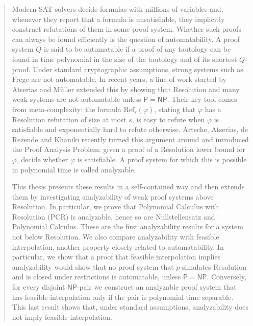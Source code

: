 \begin{abstract}
    Modern SAT solvers decide formulas with millions of variables and, whenever they report that a formula is unsatisfiable, they implicitly construct refutations of them in some proof system. Whether such proofs can always be found efficiently is the question of automatability. A proof system $Q$ is said to be automatable if a proof of any tautology can be found in time polynomial in the size of the tautology and of its shortest $Q$-proof. Under standard cryptographic assumptions, strong systems such as Frege are not automatable. In recent years, a line of work started by Atserias and Müller extended this by showing that Resolution and many weak systems are not automatable unless $\mathsf{P} = \mathsf{NP}$. Their key tool comes from meta-complexity: the formula $\mathrm{Ref}_s(\varphi)$, stating that $\varphi$ has a Resolution refutation of size at most $s$, is easy to refute when $\varphi$ is satisfiable and exponentially hard to refute otherwise. Arteche, Atserias, de Rezende and Khaniki recently turned this argument around and introduced the Proof Analysis Problem: given a proof of a Resolution lower bound for $\varphi$, decide whether $\varphi$ is satisfiable. A proof system for which this is possible in polynomial time is called analyzable.

    This thesis presents these results in a self-contained way and then extends them by investigating analyzability of weak proof systems above Resolution. In particular, we prove that Polynomial Calculus with Resolution (PCR) is analyzable, hence so are Nullstellensatz and Polynomial Calculus. These are the first analyzability results for a system not below Resolution. We also compare analyzability with feasible interpolation, another property closely related to automatability. In particular, we show that a proof that feasible interpolation implies analyzability would show that no proof system that $p$-simulates Resolution and is closed under restrictions is automatable, unless $\mathsf{P} = \mathsf{NP}$. Conversely, for every disjoint $\mathsf{NP}$-pair we construct an analyzable proof system that has feasible interpolation only if the pair is polynomial-time separable. This last result shows that, under standard assumptions, analyzability does not imply feasible interpolation.
\end{abstract}

\let\cleardoublepage\clearpage

